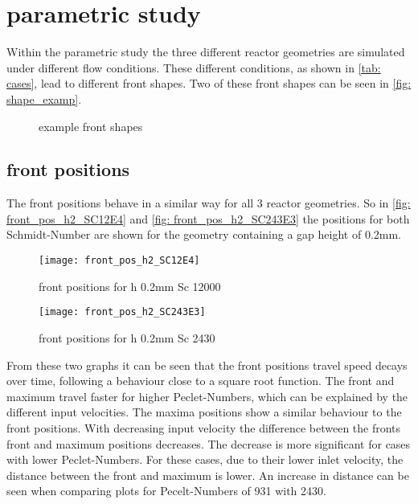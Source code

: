 \documentclass[../thesis.tex]{subfiles}
\begin{document}
\chapter{parametric study}
\label{chp: para_stud}
Within the parametric study the three different reactor geometries are simulated under different flow conditions. These different conditions, as shown in \autoref{tab: cases}, lead to different front shapes. Two of these front shapes can be seen in \autoref{fig: shape_examp}.
\begin{figure}[htb]
	\centering
	\qquad
	\caption{example front shapes}%
	\label{fig: shape_examp}%
\end{figure}

\section{front positions}

The front positions behave in a similar way for all 3 reactor geometries. So in \autoref{fig: front_pos_h2_SC12E4} and \autoref{fig: front_pos_h2_SC243E3} the positions for both Schmidt-Number are shown for the geometry containing a gap height of 0.2mm.
\begin{figure}[htbp]
	\centering
	\texttt{[image: front\_pos\_h2\_SC12E4]}
	\caption{front positions for h 0.2mm Sc 12000\label{fig: front_pos_h2_SC12E4}}\bigskip
	\texttt{[image: front\_pos\_h2\_SC243E3]}
	\caption{front positions for h 0.2mm Sc 2430\label{fig: front_pos_h2_SC243E3}}
\end{figure}

From these two graphs it can be seen that the front positions travel speed decays over time, following a behaviour close to a  square root function. The front and maximum travel faster for higher Peclet-Numbers, which can be explained by the different input velocities. The maxima positions show a similar behaviour to the front positions. 
With decreasing input velocity the difference between the fronts front and maximum positions decreases. The decrease is more significant for cases with lower Peclet-Numbers. For these cases, due to their lower inlet velocity, the distance between the front and maximum is lower. An increase in distance can be seen when comparing plots for Pecelt-Numbers of 931 with 2430.
\end{document}
